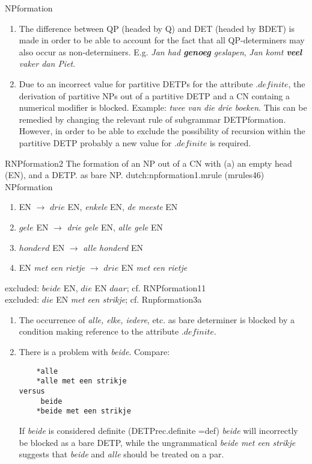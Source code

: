 \begin{mruleclass}{NPformation}
\begin{members}
\begin{member}
\begin{enumerate}
  \item 
The difference between QP (headed by Q) and DET (headed by BDET) is 
made in order to be able to account for the fact that all QP-determiners may 
also occur as non-determiners. E.g. {\em Jan had {\bf genoeg} geslapen}, {\em 
Jan komt {\bf veel} vaker dan Piet}.
  \item
Due to an incorrect value for partitive DETPs for the attribute 
.$definite$, the derivation of partitive NPs out of a partitive DETP and 
a CN containg a numerical modifier is blocked.  Example: {\em twee van die drie
boeken}. This can be remedied by changing the relevant rule of subgrammar 
DETPformation. However, in order to be able to exclude the possibility of 
recursion within the partitive DETP probably a new value for .$definite$ is 
required.
\end{enumerate}
\end{member}
\begin{member}
 RNPformation2
The formation of an NP out of a CN with (a) an empty head (EN), and a DETP.
as bare NP.
\file dutch:npformation1.mrule (mrules46)
\semantics NPformation 
\example\mbox{}\\
\begin{enumerate}
  \item 
         EN                 $\rightarrow$ $drie$ EN, {\em enkele} EN, 
{\em de meeste} EN
  \item
         $gele$ EN            $\rightarrow$ {\em drie gele} EN, 
{\em alle gele} EN
  \item
         $honderd$ EN         $\rightarrow$ {\em alle honderd} EN
  \item
         EN {\em met een rietje}  $\rightarrow$ $drie$ EN {\em met een rietje}
\end{enumerate}
         excluded: $beide$ EN, $die$ EN $daar$; cf. RNPformation11\\
         excluded: $die$ EN {\em met een strikje}; cf. Rnpformation3a
\remarks\mbox{}
\begin{enumerate}
\item 
The occurrence of {\em alle, elke, iedere}, etc. as bare determiner is blocked 
by a condition making reference to the attribute $.definite$.
\item 
There is a problem with {\em beide}. Compare:
\begin{verbatim}
    *alle
    *alle met een strikje
versus
     beide
    *beide met een strikje
\end{verbatim}
If {\em beide} is considered definite (DETPrec.definite =def)  
{\em beide} will incorrectly be blocked as a bare DETP, while 
the ungrammatical {\em beide met een strikje} suggests that {\em beide} and 
{\em alle} should be treated on  a par.


\end{enumerate}
\end{member}
\end{members}
\end{mruleclass}
